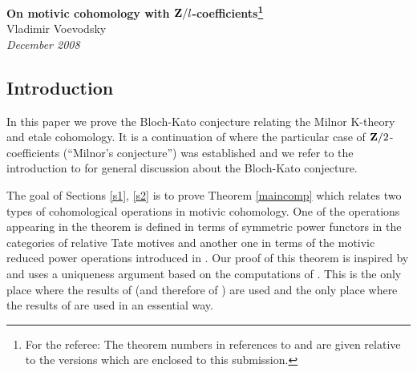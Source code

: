 \documentclass[11pt]{article}
\begin{document}
\newcommand{\subpiece}{\vskip 3mm\noindent\refstepcounter{equation}{\bf\theequation}\hspace{2mm}}{\vskip
3mm}
%
\newcommand{\maintwo}{\cite[Theorem 3.74]{Red2sub}}
\newcommand{\anotherth}{\cite[Theorem 4.24]{Red2sub}}
%
\newcommand{\refsltensor}{\cite[Lemma 5.15]{oversub}}
\newcommand{\refdualten}{\cite[Lemma 5.17]{oversub}}
\newcommand{\refunext}{\cite[Lemma 5.18]{oversub}}
\newcommand{\refdt}{\cite[Prop. 5.20]{oversub}}%
\newcommand{\refdonotneed}{\cite[Lemma 6.9]{oversub}}
\newcommand{\refrl}{\cite[Lemma 6.11]{oversub}}%
\newcommand{\refintres}{\cite[Lemma 6.12]{oversub}}%
\newcommand{\refmotdual}{\cite[Lemma 6.14]{oversub}}
\newcommand{\refspcase}{\cite[Lemma 6.15]{oversub}}
\newcommand{\refwheneq}{\cite[Lemma 6.23]{oversub}}
\newcommand{\refappmain}{\cite[Th. 8.3]{oversub}}




%
%
\begin{center}
{\Large\bf On motivic cohomology with ${\bf Z\rm}/l$-coefficients\footnote{For the referee: The theorem numbers in references to \cite{Red2sub} and \cite{oversub} are given relative to the versions which are enclosed to this submission.}}\\
\vskip 4mm
{\large Vladimir Voevodsky}\\
{\em December 2008}
\end{center}
\vskip 4mm
%
\begin{abstract}
In this paper we prove the conjecture of Bloch and Kato which relates Milnor's K-theory of a field with its Galois cohomology as well as the related comparisons results for motivic cohomology with finite coefficients in the Nisnevich and etale topologies. \end{abstract}
%
\tableofcontents
%
\subsection{Introduction}
%
In this paper we prove the Bloch-Kato conjecture relating the Milnor
K-theory and etale cohomology. It is a continuation of \cite{MCpub}
where the particular case of ${\bf Z\rm}/2$-coefficients (``Milnor's
conjecture'') was established and we refer to the introduction to
\cite{MCpub} for general discussion about the Bloch-Kato conjecture. 

The goal of Sections \ref{s1}, \ref{s2} is to prove Theorem
\ref{maincomp} which relates two types of cohomological operations in
motivic cohomology. One of the operations appearing in the theorem is
defined in terms of symmetric power functors in the categories of
relative Tate motives and another one in terms of the motivic reduced
power operations introduced in \cite{Redpub}. Our proof of this theorem is inspired by
\cite{kraines} and uses a uniqueness argument based on the computations of \cite{Red2sub}. This is the only place where the results of \cite{Red2sub} (and therefore of \cite{SRFsub}) are used and the only place where the results of \cite{oversub} are used in an essential way.
\end{document}
